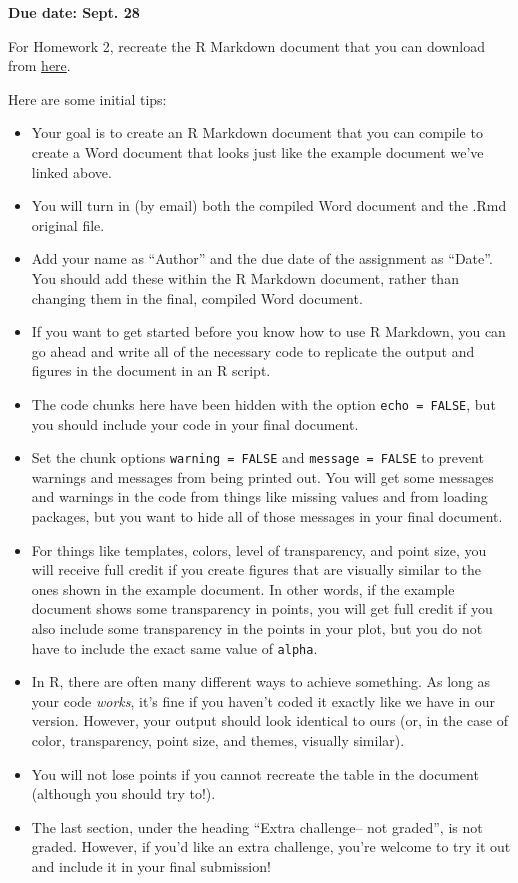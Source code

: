 \documentclass[]{book}
\providecommand{\tightlist}{%
  \setlength{\itemsep}{0pt}\setlength{\parskip}{0pt}}
\theoremstyle{definition}
\theoremstyle{definition}
\theoremstyle{definition}
\theoremstyle{remark}
\begin{document}
\textbf{Due date: Sept. 28}

For Homework 2, recreate the R Markdown document that you can download
from
\href{https://github.com/geanders/RProgrammingForResearch/raw/master/Homework/Homework_2.docx}{here}.

Here are some initial tips:

\begin{itemize}
\tightlist
\item
  Your goal is to create an R Markdown document that you can compile to
  create a Word document that looks just like the example document we've
  linked above.
\item
  You will turn in (by email) both the compiled Word document and the
  .Rmd original file.
\item
  Add your name as ``Author'' and the due date of the assignment as
  ``Date''. You should add these within the R Markdown document, rather
  than changing them in the final, compiled Word document.
\item
  If you want to get started before you know how to use R Markdown, you
  can go ahead and write all of the necessary code to replicate the
  output and figures in the document in an R script.
\item
  The code chunks here have been hidden with the option
  \texttt{echo\ =\ FALSE}, but you should include your code in your
  final document.
\item
  Set the chunk options \texttt{warning\ =\ FALSE} and
  \texttt{message\ =\ FALSE} to prevent warnings and messages from being
  printed out. You will get some messages and warnings in the code from
  things like missing values and from loading packages, but you want to
  hide all of those messages in your final document.
\item
  For things like templates, colors, level of transparency, and point
  size, you will receive full credit if you create figures that are
  visually similar to the ones shown in the example document. In other
  words, if the example document shows some transparency in points, you
  will get full credit if you also include some transparency in the
  points in your plot, but you do not have to include the exact same
  value of \texttt{alpha}.
\item
  In R, there are often many different ways to achieve something. As
  long as your code \emph{works}, it's fine if you haven't coded it
  exactly like we have in our version. However, your output should look
  identical to ours (or, in the case of color, transparency, point size,
  and themes, visually similar).
\item
  You will not lose points if you cannot recreate the table in the
  document (although you should try to!).
\item
  The last section, under the heading ``Extra challenge-- not graded'',
  is not graded. However, if you'd like an extra challenge, you're
  welcome to try it out and include it in your final submission!
\end{itemize}
\end{document}
